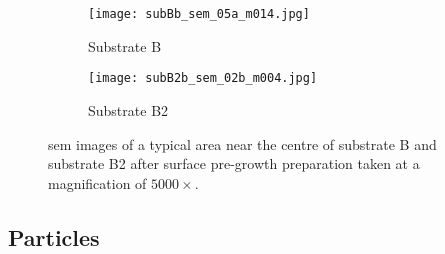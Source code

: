 
\begin{figure}[htbp]
    \begin{subfigure}[t]{0.49\textwidth}
        \texttt{[image: subBb\_sem\_05a\_m014.jpg]}
        \caption{Substrate B}\label{fig:subBb_sem_typical_centre}
    \end{subfigure}%
    \hfill
    \begin{subfigure}[t]{0.49\textwidth}
        \texttt{[image: subB2b\_sem\_02b\_m004.jpg]}
        \caption{Substrate B2}\label{fig:subB2b_sem_typical_centre}
    \end{subfigure}%
    \caption[\Ac{sem} images of typical areas on substrate B and B2 with surface pre-growth preparation.]{\Acf{sem} images of a typical area near the centre of substrate B and substrate B2 after surface pre-growth preparation taken at a magnification of $5000\times$.}\label{fig:subBb_and_subB2b_sem_typical}
\end{figure}


\subsection{Particles}

